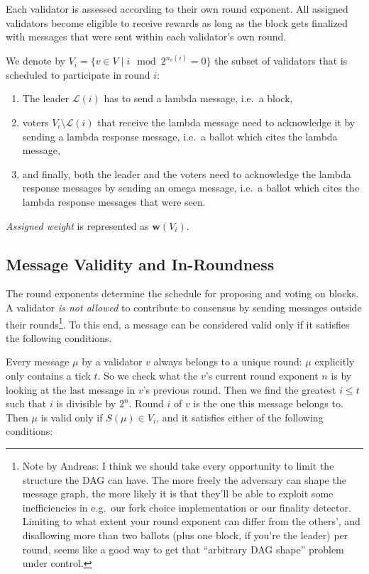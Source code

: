 Each validator is assessed according to their own round exponent. All assigned validators become eligible to receive rewards as long as the block gets finalized with messages that were sent within each validator's own round.

We denote by $V_{i}=\{v\in V \mid i \mod 2^{n_v(i)} = 0\}$ the subset of validators that is scheduled to participate in round $i$:

\begin{enumerate}
\item
  The leader $\mathcal{L}(i)$ has to send a lambda message, i.e.~a block,
\item
  voters $V_i\setminus \mathcal{L}(i)$ that receive the lambda message need to acknowledge it by sending a lambda response message, i.e.~a ballot which cites the lambda message,
\item
  and finally, both the leader and the voters need to acknowledge the lambda response messages by sending an omega message, i.e.~a ballot which cites the lambda response messages that were seen.
\end{enumerate}

\emph{Assigned weight} is represented as $\boldsymbol{w}(V_i)$.

\subsection{Message Validity and In-Roundness}
\label{sec:message-validity-and-in-roundness}

The round exponents determine the schedule for proposing and voting on blocks. A validator \emph{is not allowed} to contribute to consensus by sending messages outside their rounds\footnote{Note by Andreas: I think we should take every opportunity to limit the structure the DAG can have. The more freely the adversary can shape the message graph, the more likely it is that they'll be able to exploit some inefficiencies in e.g.~our fork choice implementation or our finality detector. Limiting to what extent your round exponent can differ from the others', and disallowing more than two ballots (plus one block, if you're the leader) per round, seems like a good way to get that ``arbitrary DAG shape'' problem under control.}. To this end, a message can be considered valid only if it satisfies the following conditions.

Every message $\mu$ by a validator $v$ always belongs to a unique round: $\mu$ explicitly only contains a tick $t$. So we check what the $v$'s current round exponent $n$ is by looking at the last message in $v$'s previous round. Then we find the greatest $i\leq t$ such that $i$ is divisible by $2^n$. Round $i$ of $v$ is the one this message belongs to. Then $\mu$ is valid only if $S(\mu)\in V_i$, and it satisfies either of the following conditions:

